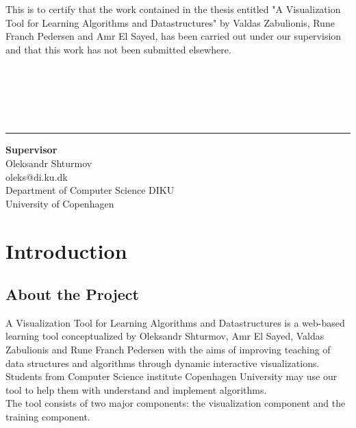 \documentclass[11pt]{article}
\begin{document}
This is to certify that the work contained in the thesis entitled "A Visualization Tool for Learning Algorithms and Datastructures" by Valdas Zabulionis, Rune Franch Pedersen and Amr El Sayed, has been carried out under our supervision and that this work has not been submitted elsewhere.\\\\\\\\\\\\
\begin{center}\noindent\rule{8cm}{0.4pt}%

\begin{center}
\textbf{Supervisor}\\
Oleksandr Shturmov \\
oleks@di.ku.dk \\
Department of Computer Science DIKU \\
University of Copenhagen
\end{center}
\newpage
\tableofcontents
\end{center}
\newpage

\section{Introduction}
\subsection{About the Project}
A Visualization Tool for Learning Algorithms and Datastructures is a web-based learning tool conceptualized by Oleksandr Shturmov, Amr El Sayed, Valdas Zabulionis and Rune Franch Pedersen with the aims of improving teaching of data structures and algorithms through dynamic interactive visualizations. Students from Computer Science institute Copenhagen University may use our tool to help them with understand and implement algorithms. \\
The tool consists of two major components: the visualization component and the training component.
\end{document}
